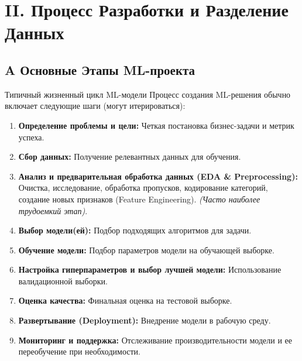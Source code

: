 \section{II. Процесс Разработки и Разделение Данных}

\subsection{A Основные Этапы ML-проекта}
\begin{textbox}{Типичный жизненный цикл ML-модели}
    Процесс создания ML-решения обычно включает следующие шаги (могут итерироваться):
    \begin{enumerate}[nosep]
        \item \textbf{Определение проблемы и цели:} Четкая постановка бизнес-задачи и метрик успеха.
        \item \textbf{Сбор данных:} Получение релевантных данных для обучения.
        \item \textbf{Анализ и предварительная обработка данных (EDA \& Preprocessing):} Очистка, исследование, обработка пропусков, кодирование категорий, создание новых признаков (Feature Engineering). \textit{(Часто наиболее трудоемкий этап)}.
        \item \textbf{Выбор модели(ей):} Подбор подходящих алгоритмов для задачи.
        \item \textbf{Обучение модели:} Подбор параметров модели на обучающей выборке.
        \item \textbf{Настройка гиперпараметров и выбор лучшей модели:} Использование валидационной выборки.
        \item \textbf{Оценка качества:} Финальная оценка на тестовой выборке.
        \item \textbf{Развертывание (Deployment):} Внедрение модели в рабочую среду.
        \item \textbf{Мониторинг и поддержка:} Отслеживание производительности модели и ее переобучение при необходимости.
    \end{enumerate}
\end{textbox}

